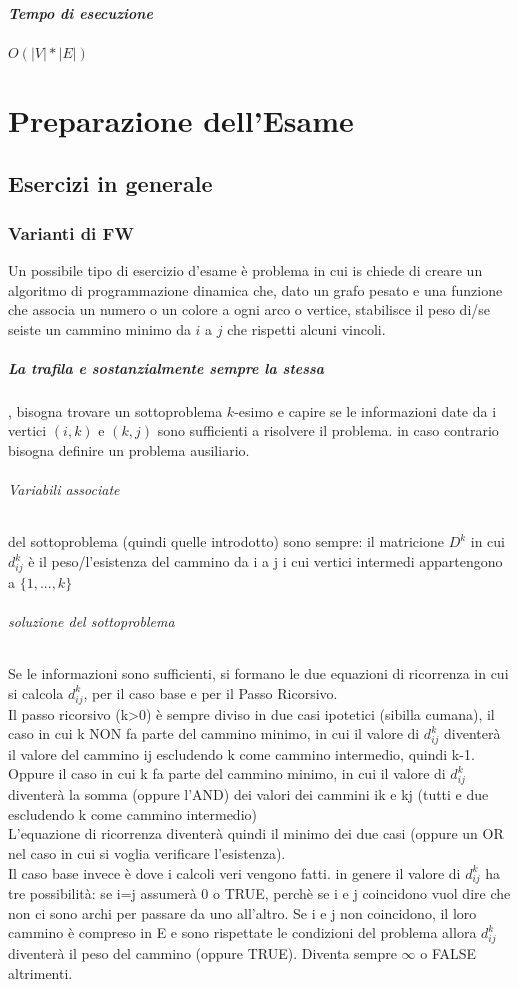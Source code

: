 \documentclass[12pt, a4paper, openany]{book}
\begin{document}
\paragraph{Tempo di esecuzione}
\begin{center}
	$O(|V|*|E|)$
\end{center}

\chapter{Preparazione dell'Esame}
\section{Esercizi in generale}
\subsection{Varianti di FW}
Un possibile tipo di esercizio d'esame è problema in cui is chiede di creare un algoritmo di programmazione dinamica
che, dato un grafo pesato e una funzione che associa un numero o un colore a ogni arco o vertice, stabilisce {il peso di}/{se seiste} un cammino minimo da $i$ a $j$
che rispetti alcuni vincoli.
\paragraph{La trafila e sostanzialmente sempre la stessa}, bisogna trovare un sottoproblema $k$-esimo e capire se le informazioni date da i vertici $(i,k)$ e $(k,j)$
sono sufficienti a risolvere il problema. in caso contrario bisogna definire un problema ausiliario.
\subparagraph{Variabili associate} del sottoproblema (quindi quelle introdotto) sono sempre: il matricione $D^k$ in cui $d^k_{ij}$ è il peso/l'esistenza del cammino da i a j
i cui vertici intermedi appartengono a $\{1,...,k\}$
\subparagraph{soluzione del sottoproblema}
Se le informazioni sono sufficienti, si formano le due equazioni di ricorrenza in cui si calcola $d^k_{ij}$, per il caso base e per il Passo Ricorsivo.
\\Il passo ricorsivo (k>0) è sempre diviso in due casi ipotetici (sibilla cumana), il caso in cui k NON fa parte del cammino minimo, in cui il valore di $d^k_{ij}$ diventerà
il valore del cammino ij escludendo k come cammino intermedio, quindi k-1.\\Oppure il caso in cui k fa parte del cammino minimo, in cui il valore di $d^k_{ij}$ diventerà la somma (oppure l'AND) dei valori dei cammini ik e kj (tutti e due escludendo k come cammino intermedio)
\\L'equazione di ricorrenza diventerà quindi il minimo dei due casi (oppure un OR nel caso in cui si voglia verificare l'esistenza).\\
Il caso base invece è dove i calcoli veri vengono fatti. in genere il valore di $d^k_{ij}$ ha tre possibilità: se i=j assumerà 0 o TRUE, perchè se i e j coincidono vuol dire che non ci sono archi per passare da uno all'altro.
Se i e j non coincidono, il loro cammino è compreso in E e sono rispettate le condizioni del problema allora $d^k_{ij}$ diventerà il peso del cammino (oppure TRUE). Diventa sempre $\infty$ o FALSE altrimenti.
\end{document}
